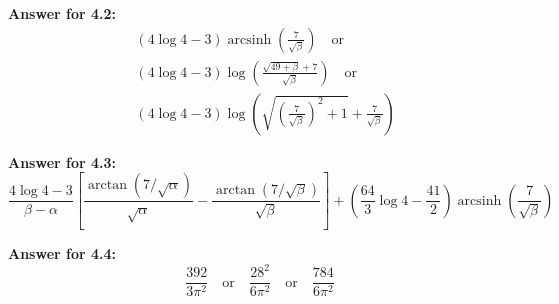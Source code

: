 \documentclass[12pt]{article}
\DeclareMathOperator{\arcsinh}{arcsinh}
\begin{document}
\par \textbf{Answer for 4.2: }
\begin{equation*}
    \begin{split}
        &(4 \log 4 - 3)\arcsinh (\frac{7}{\sqrt{\beta}})\quad \text{or}\\
        &(4 \log 4 - 3)\log (\frac{\sqrt{49+\beta} + 7}{\sqrt{\beta}})\quad \text{or}\\
        &(4 \log 4 - 3)\log(\sqrt{(\frac{7}{\sqrt{\beta}})^2+1} + \frac{7}{\sqrt{\beta}})
    \end{split}
\end{equation*}

\par \textbf{Answer for 4.3: }
\begin{equation*}
    \frac{4\log 4 - 3}{\beta - \alpha}\left[\frac{\arctan(7/\sqrt{\alpha})}{\sqrt{\alpha}} - \frac{\arctan(7/\sqrt{\beta})}{\sqrt{\beta}}\right] 
    + (\frac{64}{3}\log 4 - \frac{41}{2})\arcsinh(\frac{7}{\sqrt{\beta}})
\end{equation*}

\par \textbf{Answer for 4.4: }
\begin{equation*}
    \frac{392}{3\pi^2} \quad \text{or} \quad \frac{28^2}{6\pi^2} \quad \text{or}\quad \frac{784}{6\pi^2}
\end{equation*}
\end{document}
